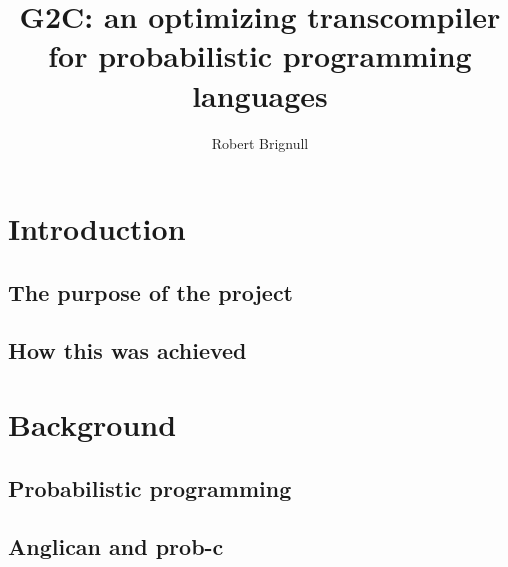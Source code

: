 \documentclass{article}
\title{G2C: an optimizing transcompiler for probabilistic programming languages}
\author{Robert Brignull}
\date{ }
\begin{document}
\maketitle

\tableofcontents


\section{Introduction}

\subsection{The purpose of the project}

\subsection{How this was achieved}


\section{Background}

\subsection{Probabilistic programming}

\subsection{Anglican and prob-c}
\end{document}
